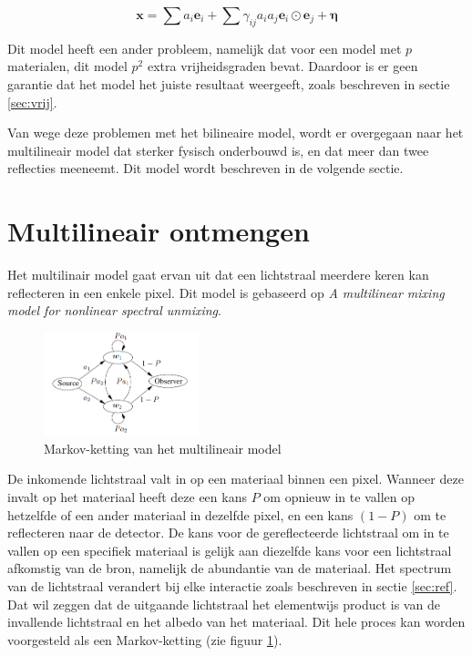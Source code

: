 \documentclass[12pt]{report}
\begin{document}
\begin{equation}
\bm{x} = \sum a_i \bm{e}_i + \sum \gamma_{ij} a_i a_j \bm{e}_i \odot \bm{e}_j + \bm{\eta}
\end{equation}

Dit model heeft een ander probleem, namelijk dat voor een model met $p$ materialen, dit model $p^2$ extra vrijheidsgraden bevat. Daardoor is er geen garantie dat het model het juiste resultaat weergeeft, zoals beschreven in sectie \ref{sec:vrij}. 

Van wege deze problemen met het bilineaire model, wordt er overgegaan naar het multilineair model dat sterker fysisch onderbouwd is, en dat meer dan twee reflecties meeneemt. Dit model wordt beschreven in de volgende sectie.

\section{Multilineair ontmengen} \label{sec:multi}

Het multilinair model gaat ervan uit dat een lichtstraal meerdere keren kan reflecteren in een enkele pixel. Dit model is gebaseerd op \textit{A multilinear mixing model for nonlinear spectral unmixing}\cite{mlinmix}. 

\begin{figure}
\includegraphics[width=0.4\textwidth]{multi.PNG}
\caption{Markov-ketting van het multilineair model \label{fig:multi}}
\end{figure}

De inkomende lichtstraal valt in op een materiaal binnen een pixel. Wanneer deze invalt op het materiaal heeft deze een kans $P$ om opnieuw in te vallen op hetzelfde of een ander materiaal in dezelfde pixel, en een kans $(1 - P)$ om te reflecteren naar de detector. De kans voor de gereflecteerde lichtstraal om in te vallen op een specifiek materiaal is gelijk aan diezelfde kans voor een lichtstraal afkomstig van de bron, namelijk de abundantie van de materiaal. Het spectrum van de lichtstraal verandert bij elke interactie zoals beschreven in sectie \ref{sec:ref}. Dat wil zeggen dat de uitgaande lichtstraal het elementwijs product is van de invallende lichtstraal en het albedo van het materiaal.
Dit hele proces kan worden voorgesteld als een Markov-ketting (zie figuur \ref{fig:multi}).
\end{document}
